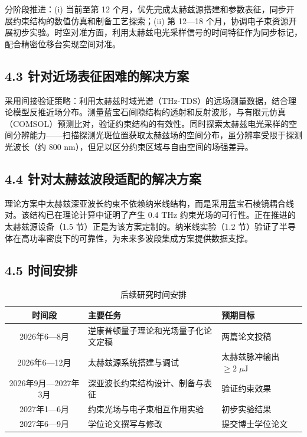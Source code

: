 \documentclass[a4paper,12pt]{ctexart}
\begin{document}
分阶段推进：(i) 当前至第 12 个月，优先完成太赫兹源搭建和参数表征，同步开展约束结构的数值仿真和制备工艺探索；(ii) 第 12—18 个月，协调电子束资源开展初步实验。时空对准方面，利用太赫兹电光采样信号的时间特征作为同步标记，配合精密位移台实现空间对准。

\subsection{4.3 针对近场表征困难的解决方案}

采用间接验证策略：利用太赫兹时域光谱（THz-TDS）的远场测量数据，结合理论模型反推近场分布。测量蓝宝石间隙结构的透射和反射波形，与有限元仿真（COMSOL）预测比对，验证约束结构的有效性。同时探索太赫兹电光采样的空间分辨能力——扫描探测光斑位置获取太赫兹场的空间分布，虽分辨率受限于探测光波长（约 800 nm），但足以区分约束区域与自由空间的场强差异。

\subsection{4.4 针对太赫兹波段适配的解决方案}

理论方案中太赫兹深亚波长约束不依赖纳米线结构，而是采用蓝宝石棱镜耦合线对。该结构已在理论计算中证明了产生 0.4 THz 约束光场的可行性。正在推进的太赫兹源设备（1.5 节）正是为该方案定制的。纳米线实验（1.2 节）验证了半导体在高功率密度下的可靠性，为未来多波段集成方案提供数据支撑。

\subsection{4.5 时间安排}

\begin{table}[H]
    \caption{\label{tab:timeline}后续研究时间安排}
    \begin{tabularx}{\linewidth}{c|X|X}
        \hline
        \textbf{时间段} & \textbf{主要任务} & \textbf{预期目标} \\
        \hline
        2026年6—8月 & 逆康普顿量子理论和光场量子化论文定稿 & 两篇论文投稿 \\
        \hline
        2026年6—12月 & 太赫兹源系统搭建与调试 & 太赫兹脉冲输出 $\geq 2\;\mu\text{J}$ \\
        \hline
        2026年9月—2027年3月 & 深亚波长约束结构设计、制备与表征 & 验证约束效果 \\
        \hline
        2027年1—6月 & 约束光场与电子束相互作用实验 & 初步实验结果 \\
        \hline
        2027年6—9月 & 学位论文撰写与修改 & 提交博士学位论文 \\
        \hline
    \end{tabularx}
\end{table}
\end{document}
